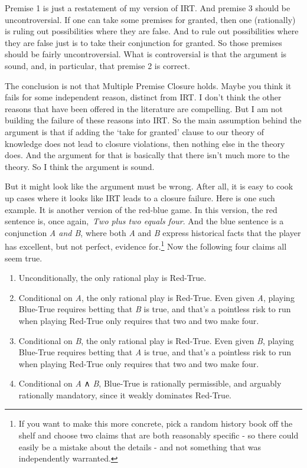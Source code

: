 \documentclass[
  11pt,
]{book}
\providecommand{\tightlist}{%
  \setlength{\itemsep}{0pt}\setlength{\parskip}{0pt}}
\begin{document}
Premise 1 is just a restatement of my version of IRT. And premise 3 should be uncontroversial. If one can take some premises for granted, then one (rationally) is ruling out possibilities where they are false. And to rule out possibilities where they are false just is to take their conjunction for granted. So those premises should be fairly uncontroversial. What is controversial is that the argument is sound, and, in particular, that premise 2 is correct.

The conclusion is not that Multiple Premise Closure holds. Maybe you think it fails for some independent reason, distinct from IRT. I don't think the other reasons that have been offered in the literature are compelling. But I am not building the failure of these reasons into IRT. So the main assumption behind the argument is that if adding the `take for granted' clause to our theory of knowledge does not lead to closure violations, then nothing else in the theory does. And the argument for that is basically that there isn't much more to the theory. So I think the argument is sound.

But it might look like the argument must be wrong. After all, it is easy to cook up cases where it looks like IRT leads to a closure failure. Here is one such example. It is another version of the red-blue game. In this version, the red sentence is, once again,~\emph{Two plus two equals four}. And the blue sentence is a conjunction \emph{A and B}, where both \emph{A} and \emph{B} express historical facts that the player has excellent, but not perfect, evidence for.\footnote{If you want to make this more concrete, pick a random history book off the shelf and choose two claims that are both reasonably specific - so there could easily be a mistake about the details - and not something that was independently warranted.} Now the following four claims all seem true.

\begin{enumerate}
\def\labelenumi{\arabic{enumi}.}
\tightlist
\item
  Unconditionally, the only rational play is Red-True.
\item
  Conditional on \emph{A}, the only rational play is Red-True. Even given \emph{A}, playing Blue-True requires betting that \emph{B} is true, and that's a pointless risk to run when playing Red-True only requires that two and two make four.
\item
  Conditional on \emph{B}, the only rational play is Red-True. Even given \emph{B}, playing Blue-True requires betting that \emph{A} is true, and that's a pointless risk to run when playing Red-True only requires that two and two make four.
\item
  Conditional on \emph{A} ∧ \emph{B}, Blue-True is rationally permissible, and arguably rationally mandatory, since it weakly dominates Red-True.
\end{enumerate}
\end{document}
